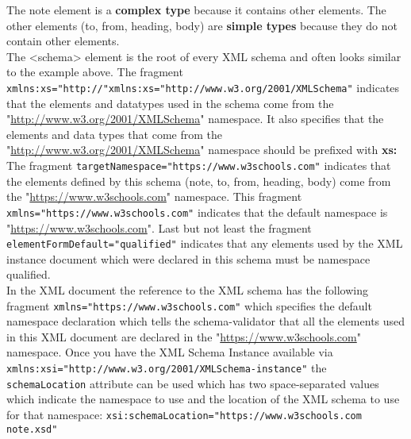 \documentclass[11pt]{article}
\begin{document}
The note element is a \textbf{complex type} because it contains other elements. The other elements (to, from, heading, body) are \textbf{simple types} because they do not contain other elements.\\
The <schema> element is the root of every XML schema and often looks similar to the example above. The fragment \texttt{xmlns:xs="http://"xmlns:xs="http://www.w3.org/2001/XMLSchema"} indicates that the elements and datatypes used in the schema come from the "\url{http://www.w3.org/2001/XMLSchema}" namespace. It also specifies that the elements and data types that come from the "\url{http://www.w3.org/2001/XMLSchema}" namespace should be prefixed with \textbf{xs:}\\
The fragment \texttt{targetNamespace="https://www.w3schools.com"} indicates that the elements defined by this schema (note, to, from, heading, body) come from the "\url{https://www.w3schools.com}" namespace. This fragment \texttt{xmlns="https://www.w3schools.com"} indicates that the default namespace is "\url{https://www.w3schools.com}". Last but not least the fragment \texttt{elementFormDefault="qualified"} indicates that any elements used by the XML instance document which were declared in this schema must be namespace qualified.\\
In the XML document the reference to the XML schema has the following fragment \texttt{xmlns="https://www.w3schools.com"} which specifies the default namespace declaration which tells the schema-validator that all the elements used in this XML document are declared in the "\url{https://www.w3schools.com}" namespace. Once you have the XML Schema Instance available via \texttt{xmlns:xsi="http://www.w3.org/2001/XMLSchema-instance"} the \texttt{schemaLocation} attribute can be used which has two space-separated values which indicate the namespace to use and the location of the XML schema to use for that namespace: \texttt{xsi:schemaLocation="https://www.w3schools.com note.xsd"}
\end{document}
